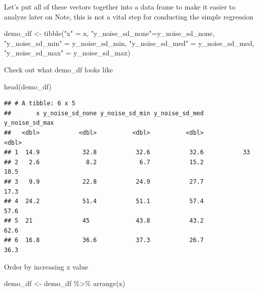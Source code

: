 \documentclass[
]{book}
\newenvironment{Shaded}{\begin{snugshade}}{\end{snugshade}}
\newcommand{\FunctionTok}[1]{\textcolor[rgb]{0.00,0.00,0.00}{#1}}
\newcommand{\NormalTok}[1]{#1}
\newcommand{\OtherTok}[1]{\textcolor[rgb]{0.56,0.35,0.01}{#1}}
\newcommand{\SpecialCharTok}[1]{\textcolor[rgb]{0.00,0.00,0.00}{#1}}
\newcommand{\StringTok}[1]{\textcolor[rgb]{0.31,0.60,0.02}{#1}}
\begin{document}
Let's put all of these vectors together into a data frame to make it easier to analyze later on
Note, this is not a vital step for conducting the simple regression

\begin{Shaded}
\begin{Highlighting}[]
\NormalTok{demo\_df }\OtherTok{\textless{}{-}} \FunctionTok{tibble}\NormalTok{(}\StringTok{"x"} \OtherTok{=}\NormalTok{ x, }
                  \StringTok{"y\_noise\_sd\_none"}\OtherTok{=}\NormalTok{y\_noise\_sd\_none, }
                  \StringTok{"y\_noise\_sd\_min"} \OtherTok{=}\NormalTok{ y\_noise\_sd\_min,}
                  \StringTok{"y\_noise\_sd\_med"} \OtherTok{=}\NormalTok{ y\_noise\_sd\_med,}
                  \StringTok{"y\_noise\_sd\_max"} \OtherTok{=}\NormalTok{ y\_noise\_sd\_max)}
\end{Highlighting}
\end{Shaded}

Check out what demo\_df looks like

\begin{Shaded}
\begin{Highlighting}[]
\FunctionTok{head}\NormalTok{(demo\_df)}
\end{Highlighting}
\end{Shaded}

\begin{verbatim}
## # A tibble: 6 x 5
##       x y_noise_sd_none y_noise_sd_min y_noise_sd_med y_noise_sd_max
##   <dbl>           <dbl>          <dbl>          <dbl>          <dbl>
## 1  14.9            32.8           32.6           32.6           33  
## 2   2.6             8.2            6.7           15.2           10.5
## 3   9.9            22.8           24.9           27.7           17.3
## 4  24.2            51.4           51.1           57.4           57.6
## 5  21              45             43.8           43.2           62.6
## 6  16.8            36.6           37.3           26.7           36.3
\end{verbatim}

Order by increasing x value

\begin{Shaded}
\begin{Highlighting}[]
\NormalTok{demo\_df }\OtherTok{\textless{}{-}}\NormalTok{ demo\_df }\SpecialCharTok{\%\textgreater{}\%} 
  \FunctionTok{arrange}\NormalTok{(x)}
\end{Highlighting}
\end{Shaded}
\end{document}
